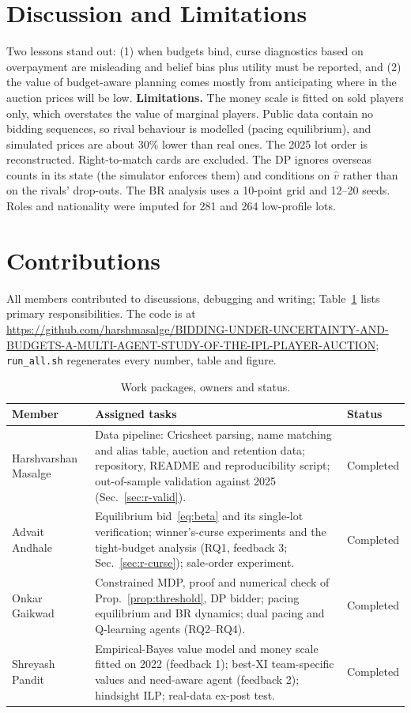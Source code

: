 \documentclass{article}
\newcommand{\1}{\mathbb{1}}
\newcommand{\repourl}{https://github.com/harshmasalge/BIDDING-UNDER-UNCERTAINTY-AND-BUDGETS-A-MULTI-AGENT-STUDY-OF-THE-IPL-PLAYER-AUCTION}
\begin{document}
\section{Discussion and Limitations}
\label{sec:discussion}
Two lessons stand out: (1) when budgets bind, curse diagnostics based on overpayment are misleading and belief bias plus utility must be reported, and (2) the value of budget-aware planning comes mostly from anticipating where in the auction prices will be low. \textbf{Limitations.} The money scale is fitted on sold players only, which overstates the value of marginal players. Public data contain no bidding sequences, so rival behaviour is modelled (pacing equilibrium), and simulated prices are about 30\% lower than real ones. The 2025 lot order is reconstructed. Right-to-match cards are excluded. The DP ignores overseas counts in its state (the simulator enforces them) and conditions on $\hat v$ rather than on the rivals' drop-outs. The BR analysis uses a 10-point grid and 12--20 seeds. Roles and nationality were imputed for 281 and 264 low-profile lots.

\section{Contributions}
\label{sec:contrib}
All members contributed to discussions, debugging and writing; Table~\ref{tab:contrib} lists primary responsibilities. The code is at \url{\repourl}; \texttt{run\_all.sh} regenerates every number, table and figure. 
\begin{table}[h]
\centering\footnotesize
\caption{Work packages, owners and status.}
\label{tab:contrib}
\begin{tabularx}{\linewidth}{@{}lXl@{}}
\toprule
Member & Assigned tasks & Status\\
\midrule
Harshvarshan Masalge & Data pipeline: Cricsheet parsing, name matching and alias table, auction and retention data; repository, README and reproducibility script; out-of-sample validation against 2025 (Sec.~\ref{sec:r-valid}). & Completed\\
Advait Andhale & Equilibrium bid~\eqref{eq:beta} and its single-lot verification; winner's-curse experiments and the tight-budget analysis (RQ1, feedback 3; Sec.~\ref{sec:r-curse}); sale-order experiment. & Completed\\
Onkar Gaikwad & Constrained MDP, proof and numerical check of Prop.~\ref{prop:threshold}, DP bidder; pacing equilibrium and BR dynamics; dual pacing and Q-learning agents (RQ2--RQ4). & Completed\\
Shreyash Pandit & Empirical-Bayes value model and money scale fitted on 2022 (feedback 1); best-XI team-specific values and need-aware agent (feedback 2); hindsight ILP; real-data ex-post test. & Completed\\
\bottomrule
\end{tabularx}
\end{table}
\end{document}
